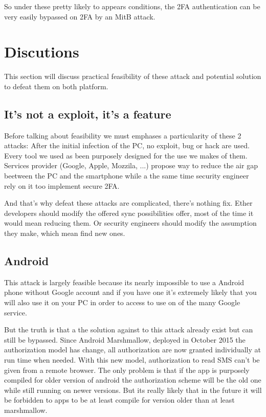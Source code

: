\documentclass[11pt, a4paper,twocolumn]{article}
\begin{document}
So under these pretty likely to appears conditions, the 2FA authentication can be very easily bypassed on 2FA by an MitB attack.


\section{Discutions} 
This section will discuss practical feasibility of these attack and potential solution to defeat them on both platform. 
\subsection{It's not a exploit, it's a feature}
Before talking about feasibility we must emphases a particularity of these 2 attacks: After the initial infection of the PC, no exploit, bug or hack are used. Every tool we used as been purposely designed for the use we makes of them. Services provider (Google, Apple, Mozzila, ...) propose way to reduce the air gap beetween the PC and the smartphone while a the same time security engineer rely on it too implement secure 2FA.

And that's why defeat  these attacks are complicated, there's nothing fix. Ether developers should modify the offered sync possibilities offer, most of the time it would mean reducing them. Or security engineers should modify the assumption they make, which mean find new ones. 
\subsection{Android}

This attack is largely feasible because its nearly impossible to use a Android phone without Google account and if you have one it's extremely likely that you will also use it on your PC in order to access to use on of the many Google service.

But the truth is that a the solution against to this attack already exist but can still be bypassed. Since Android Marshmallow, deployed in October 2015 the authorization model has change, all authorization are now granted individually at run time when needed. With this new model, authorization to read SMS can't be given from a remote browser. The only problem is that if the app is purposely compiled for older version of android the authorization scheme will be the old one while still running on newer versions. But its really likely that in the future it will be forbidden to apps to be at least compile for version older than at least marshmallow.
\end{document}
